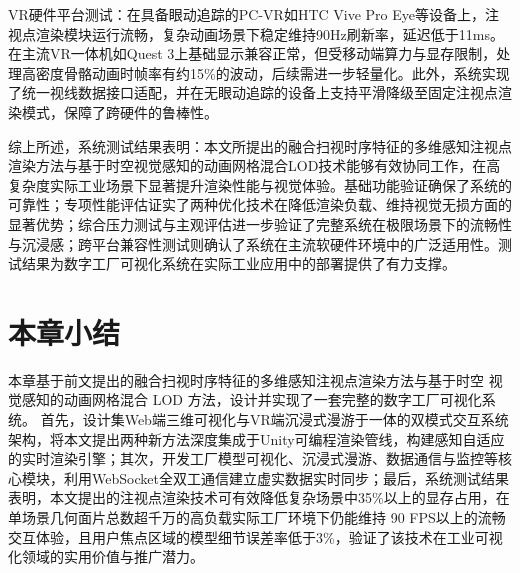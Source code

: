 VR硬件平台测试：在具备眼动追踪的PC-VR如HTC Vive Pro Eye等设备上，注视点渲染模块运行流畅，复杂动画场景下稳定维持90Hz刷新率，延迟低于11ms。在主流VR一体机如Quest 3上基础显示兼容正常，但受移动端算力与显存限制，处理高密度骨骼动画时帧率有约15\%的波动，后续需进一步轻量化。此外，系统实现了统一视线数据接口适配，并在无眼动追踪的设备上支持平滑降级至固定注视点渲染模式，保障了跨硬件的鲁棒性。

综上所述，系统测试结果表明：本文所提出的融合扫视时序特征的多维感知注视点渲染方法与基于时空视觉感知的动画网格混合LOD技术能够有效协同工作，在高复杂度实际工业场景下显著提升渲染性能与视觉体验。基础功能验证确保了系统的可靠性；专项性能评估证实了两种优化技术在降低渲染负载、维持视觉无损方面的显著优势；综合压力测试与主观评估进一步验证了完整系统在极限场景下的流畅性与沉浸感；跨平台兼容性测试则确认了系统在主流软硬件环境中的广泛适用性。测试结果为数字工厂可视化系统在实际工业应用中的部署提供了有力支撑。

\section{本章小结}

本章基于前文提出的融合扫视时序特征的多维感知注视点渲染方法与基于时空
视觉感知的动画网格混合 LOD 方法，设计并实现了一套完整的数字工厂可视化系统。
首先，设计集Web端三维可视化与VR端沉浸式漫游于一体的双模式交互系统架构，将本文提出两种新方法深度集成于Unity可编程渲染管线，构建感知自适应的实时渲染引擎；其次，开发工厂模型可视化、沉浸式漫游、数据通信与监控等核心模块，利用WebSocket全双工通信建立虚实数据实时同步；最后，系统测试结果表明，本文提出的注视点渲染技术可有效降低复杂场景中35\%以上的显存占用，在单场景几何面片总数超千万的高负载实际工厂环境下仍能维持 90 FPS以上的流畅交互体验，且用户焦点区域的模型细节误差率低于3\%，验证了该技术在工业可视化领域的实用价值与推广潜力。



